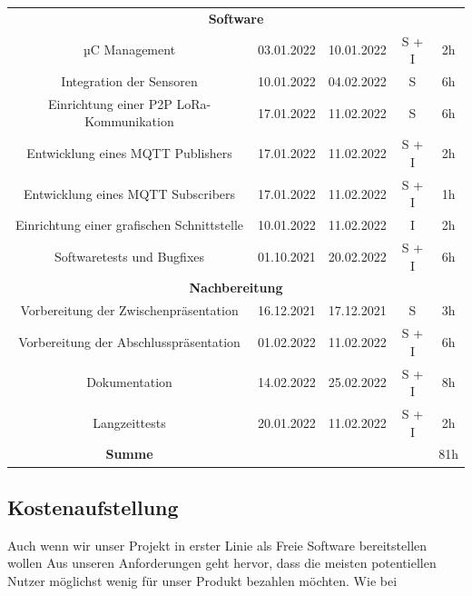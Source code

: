 \begin{adjustwidth}{-1in}{-1in}
\begin{center}
\begin{tabular}{ ccccc }
			\midrule
			\multicolumn{5}{c}{\textbf{Software}} \\
			{µC Management} & {03.01.2022} & {10.01.2022} & S + I & 2h\\
			{Integration der Sensoren} & {10.01.2022} & {04.02.2022} & S & 6h\\
			{Einrichtung einer P2P LoRa-Kommunikation} & {17.01.2022} & {11.02.2022} & S & 6h\\
			{Entwicklung eines MQTT Publishers} & {17.01.2022} & {11.02.2022} & S + I & 2h\\
			{Entwicklung eines MQTT Subscribers} & {17.01.2022} & {11.02.2022} & S + I & 1h\\
			{Einrichtung einer grafischen Schnittstelle} & {10.01.2022} & {11.02.2022} &  I & 2h\\
			{Softwaretests und Bugfixes} & {01.10.2021} & {20.02.2022} & S + I & 6h\\

			\midrule
			\multicolumn{5}{c}{\textbf{Nachbereitung}} \\
			{Vorbereitung der Zwischenpräsentation} & {16.12.2021} & {17.12.2021} & S & 3h\\
			{Vorbereitung der Abschlusspräsentation} & {01.02.2022} & {11.02.2022} & S + I & 6h\\
			{Dokumentation} & {14.02.2022} & {25.02.2022} & S + I & 8h\\
			{Langzeittests} & {20.01.2022} & {11.02.2022} & S + I & 2h\\

			\midrule
			{\textbf{Summe}} & & & & 81h\\

			\bottomrule
		\end{tabular}
		 \label{tab:worklog} 
	\end{center}

\end{adjustwidth}

\newpage

\subsection{Kostenaufstellung} \label{Kostenaufstellung}

Auch wenn wir unser Projekt in erster Linie als Freie Software bereitstellen wollen
Aus unseren Anforderungen geht hervor, dass die meisten potentiellen Nutzer möglichst wenig für unser Produkt bezahlen möchten. Wie bei 

